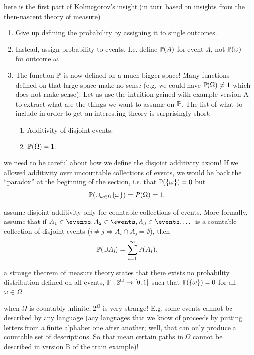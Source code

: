 \documentclass{article}
\begin{document}
 here is the first part of Kolmogorov's insight (in turn based on insights from the then-nascent theory of measure)
\begin{enumerate}
	\item Give up defining the probability by assigning it to single outcomes.
	\item Instead, assign probability to events. I.e. define $\P(A)$ for  event $A$, not $\P(\omega)$ for outcome $\omega$. 
	\item The function $\P$ is now defined on a much bigger space! Many functions defined on that large space make no sense (e.g. we could have $\P(\Omega) \neq 1$ which does not make sense). Let us use the intuition gained with example version A to extract what are the things we want to assume on $\P$. The list of what to include in order to get an interesting theory is surprisingly short:
	\begin{enumerate}
		\item Additivity of disjoint events.
		\item $\P(\Omega) = 1$.
	\end{enumerate}
\end{enumerate}

 we need to be careful about how we define the disjoint additivity axiom! If we allowed additivity over uncountable collections of events, we would be back the ``paradox'' at the beginning of the section, i.e. that $\P(\{\omega\}) = 0$ but \[ \P(\cup_{\omega \in \Omega} \{\omega\}) = P(\Omega) = 1. \]

 assume disjoint additivity only for countable collections of events. More formally, assume that if $A_1 \in \events, A_2 \in \events, A_3 \in \events, \dots$ is a countable collection of disjoint events ($i\neq j \Longrightarrow A_i \cap A_j = \emptyset$), then 
\[ \P(\cup A_i) = \sum_{i=1}^{\infty} \P(A_i). \]

 a strange theorem of measure theory states that there exists no probability distribution defined on all events, $\P:2^\Omega \to [0, 1]$ such that $\P(\{\omega\}) = 0$ for all $\omega \in \Omega$.

 when $\Omega$ is countably infinite, $2^\Omega$ is very strange! E.g. some events cannot be described by any language (any languages that we know of proceeds by putting letters from a finite alphabet one after another; well, that can only produce a countable set of descriptions. So that mean certain paths in $\Omega$ cannot be described in  version B of the train example)! 
\end{document}
